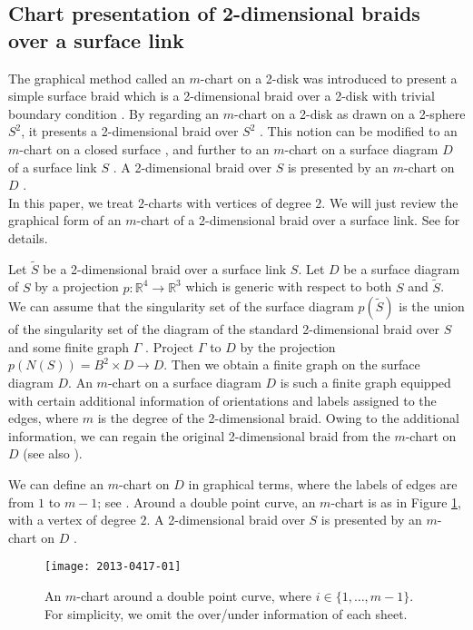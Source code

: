 \documentclass[a4paper,11pt]{amsart}
\numberwithin{equation}{section}
\begin{document}
\subsection{Chart presentation of 2-dimensional braids over a surface link} \label{sec:3-1}
 The graphical method called an $m$-chart on a 2-disk was introduced to present a simple surface braid which is a 2-dimensional braid over a 2-disk with trivial boundary condition \cite{Kamada92, Kamada02}. By regarding an $m$-chart on a 2-disk as drawn on a 2-sphere $S^2$, it presents a 2-dimensional braid over $S^2$ \cite{Kamada92, Kamada02, N1}. 
This notion can be modified to an $m$-chart on a closed surface \cite{N1}, and further to an $m$-chart on a surface diagram $D$ of a surface link $S$ \cite{N4}. A 2-dimensional braid over $S$ is presented by an $m$-chart on $D$ \cite{N4}. 
\\

In this paper, we treat $2$-charts with vertices of degree $2$. We will just review the graphical form of an $m$-chart of a 2-dimensional braid over a surface link. See \cite{N4} for details.  


Let $\widetilde{S}$ be a 2-dimensional braid over a surface link $S$. Let $D$ be a surface diagram of $S$ by a projection $p:\mathbb{R}^4 \to \mathbb{R}^3$ which is generic with respect to both $S$ and $\widetilde{S}$. 
We can assume that the singularity set of the surface diagram 
$p(\widetilde{S})$ is the union of the singularity set of the diagram of the standard 2-dimensional braid over $S$ and some finite graph $\Gamma$ \cite[Theorem 5.5]{N4}. 
Project $\Gamma$ to $D$ by the projection $p(N(S))=B^2 \times D \to D$. Then we obtain a finite graph on the surface diagram $D$. An $m$-chart on a surface diagram $D$ is such a finite graph equipped with certain additional information of orientations and labels assigned to the edges, where $m$ is the degree of the 2-dimensional braid. Owing to the additional information, we can regain the original 2-dimensional braid from the $m$-chart on $D$ \cite{N4} (see also \cite{Kamada02}).

 We can define an $m$-chart on $D$ in graphical terms, where the labels of edges are from $1$ to $m-1$; see \cite[Definitions 5.3 and 5.4]{N4}. 
Around a double point curve, an $m$-chart is as in Figure \ref{fig:0417-01}, with a vertex of degree $2$. 
A 2-dimensional braid over $S$ is presented by an $m$-chart on $D$ \cite[Theorem 5.5]{N4}. 

 \begin{figure}[ht]
 \centering\texttt{[image: 2013-0417-01]}
\caption{An $m$-chart around a double point curve, where $i \in \{1,\ldots,m-1\}$. For simplicity, we omit the over/under information of each sheet.}
\label{fig:0417-01}
 \end{figure}
\end{document}
